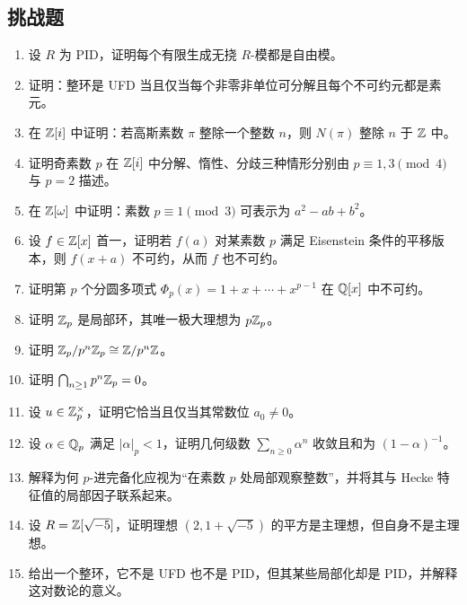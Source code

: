 \subsection*{挑战题}
\begin{enumerate}[resume, label=\textbf{\arabic*.}, leftmargin=*, itemsep=0.5em]
\item \hard 设 $R$ 为 PID，证明每个有限生成无挠 $R$-模都是自由模。
\item \hard 证明：整环是 UFD 当且仅当每个非零非单位可分解且每个不可约元都是素元。
\item \hard 在 $\mathbb{Z}[i]$ 中证明：若高斯素数 $\pi$ 整除一个整数 $n$，则 $N(\pi)$ 整除 $n$ 于 $\mathbb{Z}$ 中。
\item \hard 证明奇素数 $p$ 在 $\mathbb{Z}[i]$ 中分解、惰性、分歧三种情形分别由 $p\equiv1,3\pmod4$ 与 $p=2$ 描述。
\item \hard 在 $\mathbb{Z}[\omega]$ 中证明：素数 $p\equiv1\pmod3$ 可表示为 $a^2-ab+b^2$。
\item \hard 设 $f\in\mathbb{Z}[x]$ 首一，证明若 $f(a)$ 对某素数 $p$ 满足 Eisenstein 条件的平移版本，则 $f(x+a)$ 不可约，从而 $f$ 也不可约。
\item \hard 证明第 $p$ 个分圆多项式 $\Phi_p(x)=1+x+\cdots+x^{p-1}$ 在 $\mathbb{Q}[x]$ 中不可约。
\item \hard 证明 $\mathbb{Z}_p$ 是局部环，其唯一极大理想为 $p\mathbb{Z}_p$。
\item \hard 证明 $\mathbb{Z}_p/p^n\mathbb{Z}_p\cong \mathbb{Z}/p^n\mathbb{Z}$。
\item \hard 证明 $\bigcap_{n\ge1} p^n\mathbb{Z}_p=0$。
\item \hard 设 $u\in\mathbb{Z}_p^\times$，证明它恰当且仅当其常数位 $a_0\ne0$。
\item \hard 设 $\alpha\in \mathbb{Q}_p$ 满足 $|\alpha|_p<1$，证明几何级数 $\sum_{n\ge0}\alpha^n$ 收敛且和为 $(1-\alpha)^{-1}$。
\item \hard 解释为何 $p$-进完备化应视为“在素数 $p$ 处局部观察整数”，并将其与 Hecke 特征值的局部因子联系起来。
\item \hard 设 $R=\mathbb{Z}[\sqrt{-5}]$，证明理想 $(2,1+\sqrt{-5})$ 的平方是主理想，但自身不是主理想。
\item \hard 给出一个整环，它不是 UFD 也不是 PID，但其某些局部化却是 PID，并解释这对数论的意义。
\end{enumerate}

